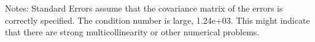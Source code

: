 Notes: \newline
 [1] Standard Errors assume that the covariance matrix of the errors is correctly specified. \newline
 [2] The condition number is large, 1.24e+03. This might indicate that there are \newline
 strong multicollinearity or other numerical problems.